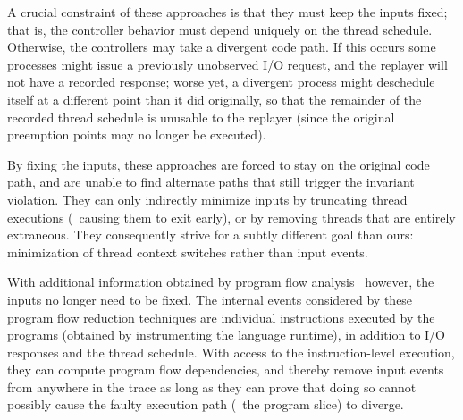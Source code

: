 A crucial constraint of these approaches is that they must keep the inputs
fixed; that is, the controller behavior must depend uniquely on the thread
schedule. Otherwise, the controllers may take a divergent code path. If this
occurs some processes might issue a previously unobserved I/O request, and the replayer will not
have a recorded response; worse yet, a divergent process might deschedule
itself at a different point than it did originally, so that the remainder of
the recorded thread schedule is unusable to the replayer (since the original preemption points
may no longer be executed).

By fixing the inputs, these approaches are forced to stay on the original code
path, and are unable to find alternate paths that still
trigger the invariant violation. They can only indirectly
minimize inputs by truncating thread executions (\ie~causing them to
exit early), or by removing threads that are entirely extraneous.
They consequently strive for a subtly different goal than ours:
minimization of thread context switches rather than input events.


With additional information obtained by program flow
analysis~\cite{Lee:2011:TGR:1993498.1993528,tallam2007enabling,huang2012lean}
however, the inputs no longer need to be fixed. The internal events considered by these program flow reduction
techniques are individual instructions executed by the
programs (obtained by instrumenting the language runtime), in addition to I/O responses and the thread schedule.
With access to the instruction-level execution, they can compute
program flow dependencies, and thereby remove input events from anywhere in the trace as long as they
can prove that doing so cannot possibly cause the faulty execution path (\ie~the program slice) to diverge.

